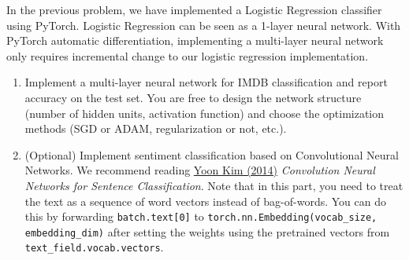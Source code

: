\begin{problem}
    In the previous problem, we have implemented a Logistic Regression classifier using PyTorch.
    Logistic Regression can be seen as a 1-layer neural network. With PyTorch automatic differentiation,
    implementing a multi-layer neural network only requires incremental change to our logistic regression
    implementation.

    \begin{enumerate}[label=(\alph*)]
        \item Implement a multi-layer neural network for IMDB classification and report accuracy
              on the test set. You are free to design the network structure (number of hidden units,
              activation function) and choose the optimization methods (SGD or ADAM, regularization 
              or not, etc.).
        \item (Optional) Implement sentiment classification based on Convolutional Neural Networks.
              We recommend reading
              \href{http://www.people.fas.harvard.edu/~yoonkim/data/sent-cnn.pdf}{Yoon Kim (2014)}
              {\textit{Convolution Neural Networks for Sentence Classification}}.
              Note that in this part, you need to treat the text as a sequence of word vectors instead of bag-of-words.
              You can do this by forwarding \texttt{batch.text[0]} to 
              \texttt{torch.nn.Embedding(vocab\_size, embedding\_dim)}
              after setting the weights using the pretrained vectors from\\
              \texttt{text\_field.vocab.vectors}.
     \end{enumerate}
\end{problem}
